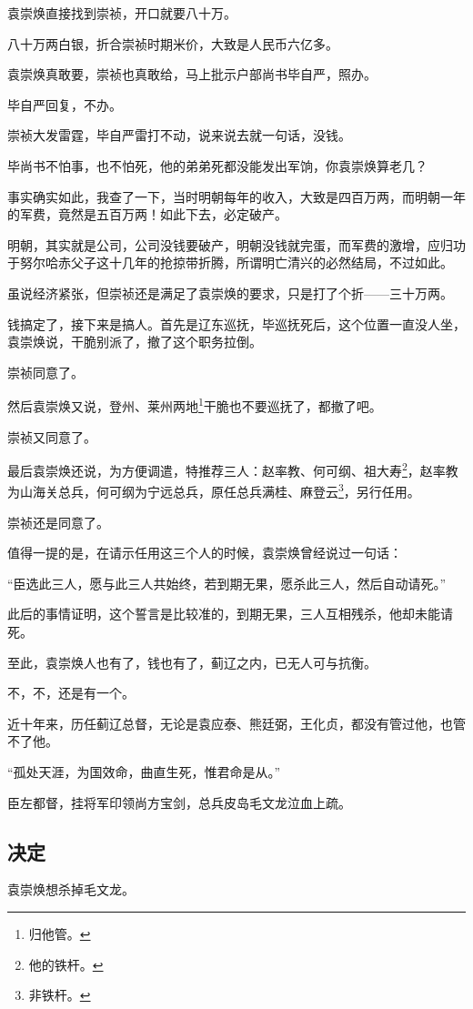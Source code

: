 \begin{multicols}{\theparacolNo}
袁崇焕直接找到崇祯，开口就要八十万。

八十万两白银，折合崇祯时期米价，大致是人民币六亿多。

袁崇焕真敢要，崇祯也真敢给，马上批示户部尚书毕自严，照办。

毕自严回复，不办。

崇祯大发雷霆，毕自严雷打不动，说来说去就一句话，没钱。

毕尚书不怕事，也不怕死，他的弟弟死都没能发出军饷，你袁崇焕算老几？

事实确实如此，我查了一下，当时明朝每年的收入，大致是四百万两，而明朝一年的军费，竟然是五百万两！如此下去，必定破产。

明朝，其实就是公司，公司没钱要破产，明朝没钱就完蛋，而军费的激增，应归功于努尔哈赤父子这十几年的抢掠带折腾，所谓明亡清兴的必然结局，不过如此。

虽说经济紧张，但崇祯还是满足了袁崇焕的要求，只是打了个折——三十万两。

钱搞定了，接下来是搞人。首先是辽东巡抚，毕巡抚死后，这个位置一直没人坐，袁崇焕说，干脆别派了，撤了这个职务拉倒。

崇祯同意了。

然后袁崇焕又说，登州、莱州两地\footnote{归他管。}干脆也不要巡抚了，都撤了吧。

崇祯又同意了。

最后袁崇焕还说，为方便调遣，特推荐三人：赵率教、何可纲、祖大寿\footnote{他的铁杆。}，赵率教为山海关总兵，何可纲为宁远总兵，原任总兵满桂、麻登云\footnote{非铁杆。}，另行任用。

崇祯还是同意了。

值得一提的是，在请示任用这三个人的时候，袁崇焕曾经说过一句话：

“臣选此三人，愿与此三人共始终，若到期无果，愿杀此三人，然后自动请死。”

此后的事情证明，这个誓言是比较准的，到期无果，三人互相残杀，他却未能请死。

至此，袁崇焕人也有了，钱也有了，蓟辽之内，已无人可与抗衡。

不，不，还是有一个。

近十年来，历任蓟辽总督，无论是袁应泰、熊廷弼，王化贞，都没有管过他，也管不了他。

“孤处天涯，为国效命，曲直生死，惟君命是从。”

臣左都督，挂将军印领尚方宝剑，总兵皮岛毛文龙泣血上疏。

\subsection{决定}
袁崇焕想杀掉毛文龙。


\end{multicols}
